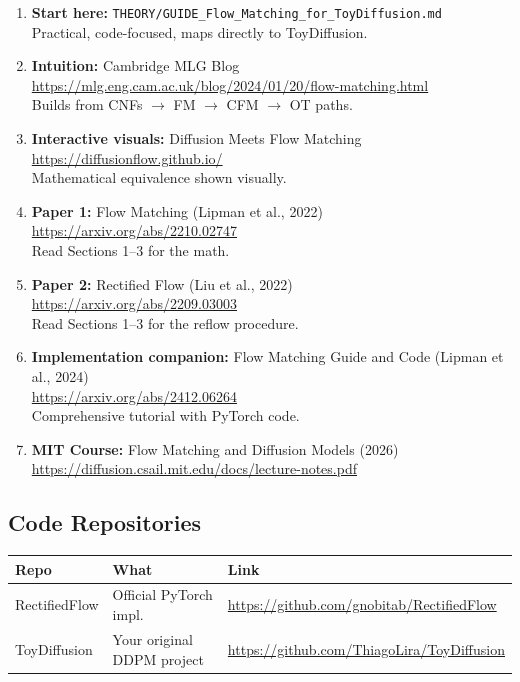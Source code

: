 \documentclass[11pt, a4paper]{article}
\begin{document}
\begin{enumerate}
  \item \textbf{Start here:}
    \texttt{THEORY/GUIDE\_Flow\_Matching\_for\_ToyDiffusion.md} \\
    Practical, code-focused, maps directly to ToyDiffusion.

  \item \textbf{Intuition:}
    Cambridge MLG Blog \\
    \url{https://mlg.eng.cam.ac.uk/blog/2024/01/20/flow-matching.html} \\
    Builds from CNFs $\to$ FM $\to$ CFM $\to$ OT paths.

  \item \textbf{Interactive visuals:}
    Diffusion Meets Flow Matching \\
    \url{https://diffusionflow.github.io/} \\
    Mathematical equivalence shown visually.

  \item \textbf{Paper 1:} Flow Matching (Lipman et al., 2022) \\
    \url{https://arxiv.org/abs/2210.02747} \\
    Read Sections 1--3 for the math.

  \item \textbf{Paper 2:} Rectified Flow (Liu et al., 2022) \\
    \url{https://arxiv.org/abs/2209.03003} \\
    Read Sections 1--3 for the reflow procedure.

  \item \textbf{Implementation companion:} Flow Matching Guide and Code
    (Lipman et al., 2024) \\
    \url{https://arxiv.org/abs/2412.06264} \\
    Comprehensive tutorial with PyTorch code.

  \item \textbf{MIT Course:} Flow Matching and Diffusion Models (2026) \\
    \url{https://diffusion.csail.mit.edu/docs/lecture-notes.pdf}
\end{enumerate}

\subsection{Code Repositories}

\begin{center}
\begin{tabular}{@{} l l l @{}}
\toprule
\textbf{Repo} & \textbf{What} & \textbf{Link} \\
\midrule
RectifiedFlow & Official PyTorch impl.
  & \url{https://github.com/gnobitab/RectifiedFlow} \\
ToyDiffusion & Your original DDPM project
  & \url{https://github.com/ThiagoLira/ToyDiffusion} \\
\bottomrule
\end{tabular}
\end{center}
\end{document}
